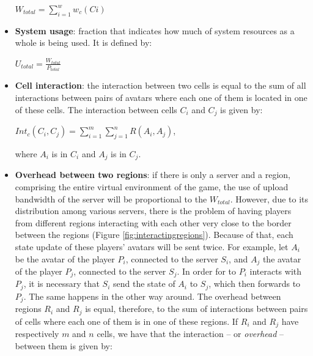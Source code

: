 \begin{itemize}
		\begin{center}
			$\displaystyle W_{total} = \sum_{i=1}^{w} w_c(Ci)$
		\end{center}
	
	
	\item \textbf{System usage}: fraction that indicates how much of system resources as a whole is being used. It is defined by:

		\begin{center}
			$\displaystyle U_{total} = \frac{W_{total}}{P_{total}}$
		\end{center}
	
	\item \textbf{Cell interaction}: the interaction between two cells is equal to the sum of all interactions between pairs of avatars where each one of them is located in one of these cells. The interaction between cells $C_i$ and $C_j$ is given by:
	
		\begin{center}
			$\displaystyle Int_c(C_i,C_j) = \sum_{i=1}^{m} \sum_{j=1}^{n} R(A_i,A_j)$,
			
			where $A_i$ is in $C_i$ and $A_j$ is in $C_j$.
		\end{center}
	
	\item \textbf{Overhead between two regions}: if there is only a server and a region, comprising the entire virtual environment of the game, the use of upload bandwidth of the server will be proportional to the $W_{total}$. However, due to its distribution among various servers, there is the problem of having players from different regions interacting with each other very close to the border between the regions (Figure \ref{fig:interactingregions}). Because of that, each state update of these players' avatars will be sent twice. For example, let $A_i$ be the avatar of the player $P_i$, connected to the server $S_i$, and $A_j$ the avatar of the player $P_j$, connected to the server $S_j$. In order for to $P_i$ interacts with $P_j$, it is necessary that $S_i$ send the state of $A_i$ to $S_j$, which then forwards to $P_j$. The same happens in the other way around. The overhead between regions $R_i$ and $R_j$ is equal, therefore, to the sum of interactions between pairs of cells where each one of them is in one of these regions. If $R_i$ and $R_j$ have respectively $m$ and $n$ cells, we have that the interaction -- or \emph{overhead} -- between them is given by:
	

\end{itemize}
